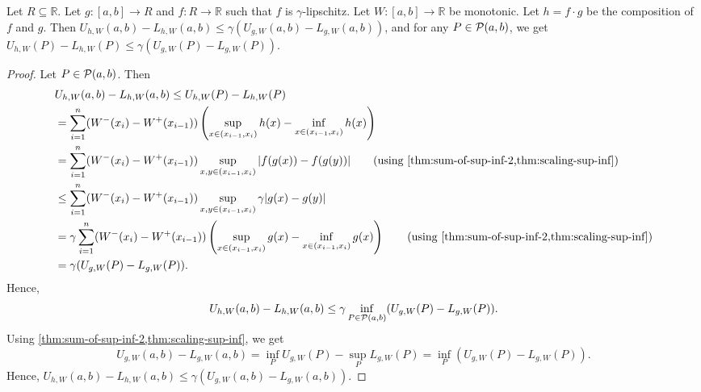 \documentclass[a4paper,12pt,fleqn]{article}
\begin{document}
\begin{lemma}
\label{thm:dint:lipschitz}
Let $R \subseteq \mathbb{R}$.
Let $g: [a, b] \to R$ and $f: R \to \mathbb{R}$
such that $f$ is $\gamma$-lipschitz.
Let $W: [a, b] \to \mathbb{R}$ be monotonic.
Let $h = f \cdot g$ be the composition of $f$ and $g$.
Then $U_{h,W}(a, b) - L_{h,W}(a, b) \le \gamma(U_{g,W}(a, b) - L_{g,W}(a, b))$,
and for any $P \in \mathcal{P}(a, b)$, we get
$U_{h,W}(P) - L_{h,W}(P) \le \gamma(U_{g,W}(P) - L_{g,W}(P))$.
\end{lemma}
\begin{proof}
Let $P \in \mathcal{P}(a, b)$. Then
\begin{align*}
& U_{h,W}(a, b) - L_{h,W}(a, b) \le U_{h,W}(P) - L_{h,W}(P)
\\ &= \sum_{i=1}^n (W^-(x_i) - W^+(x_{i-1}))
    \left(\sup_{x \in (x_{i-1}, x_i)} h(x) - \inf_{x \in (x_{i-1}, x_i)} h(x)\right)
\\ &= \sum_{i=1}^n (W^-(x_i) - W^+(x_{i-1}))
    \sup_{x, y \in (x_{i-1}, x_i)} |f(g(x)) - f(g(y))|
    \tag{using \cref{thm:sum-of-sup-inf-2,thm:scaling-sup-inf}}
\\ &\le \sum_{i=1}^n (W^-(x_i) - W^+(x_{i-1}))
    \sup_{x, y \in (x_{i-1}, x_i)} \gamma|g(x) - g(y)|
\\ &= \gamma\sum_{i=1}^n (W^-(x_i) - W^+(x_{i-1}))
    \left(\sup_{x \in (x_{i-1}, x_i)} g(x) - \inf_{x \in (x_{i-1}, x_i)} g(x)\right)
    \tag{using \cref{thm:sum-of-sup-inf-2,thm:scaling-sup-inf}}
\\ &= \gamma(U_{g,W}(P) - L_{g,W}(P)).
\end{align*}
Hence,
\[ U_{h,W}(a, b) - L_{h,W}(a, b) \le \gamma\inf_{P \in \mathcal{P}(a, b)} (U_{g,W}(P) - L_{g,W}(P)). \]
Using \cref{thm:sum-of-sup-inf-2,thm:scaling-sup-inf}, we get
\[ U_{g,W}(a, b) - L_{g,W}(a, b) = \inf_P U_{g,W}(P) - \sup_P L_{g,W}(P)
= \inf_P (U_{g,W}(P) - L_{g,W}(P)). \]
Hence, $U_{h,W}(a, b) - L_{h,W}(a, b) \le \gamma(U_{g,W}(a, b) - L_{g,W}(a, b))$.
\end{proof}
\end{document}
